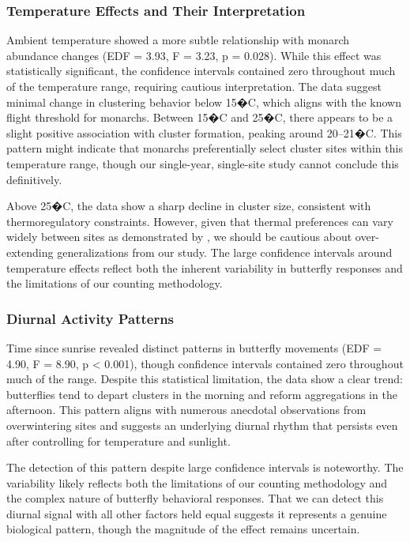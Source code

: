 \subsubsection{Temperature Effects and Their Interpretation}

Ambient temperature showed a more subtle relationship with monarch abundance changes (EDF = 3.93, F = 3.23, p = 0.028). While this effect was statistically significant, the confidence intervals contained zero throughout much of the temperature range, requiring cautious interpretation. The data suggest minimal change in clustering behavior below 15�C, which aligns with the known flight threshold for monarchs. Between 15�C and 25�C, there appears to be a slight positive association with cluster formation, peaking around 20--21�C. This pattern might indicate that monarchs preferentially select cluster sites within this temperature range, though our single-year, single-site study cannot conclude this definitively.

Above 25�C, the data show a sharp decline in cluster size, consistent with thermoregulatory constraints. However, given that thermal preferences can vary widely between sites as demonstrated by \citeauthor{SanieeThesis2016} \autocite{SanieeThesis2016}, we should be cautious about over-extending generalizations from our study. The large confidence intervals around temperature effects reflect both the inherent variability in butterfly responses and the limitations of our counting methodology.

\subsubsection{Diurnal Activity Patterns}

Time since sunrise revealed distinct patterns in butterfly movements (EDF = 4.90, F = 8.90, p < 0.001), though confidence intervals contained zero throughout much of the range. Despite this statistical limitation, the data show a clear trend: butterflies tend to depart clusters in the morning and reform aggregations in the afternoon. This pattern aligns with numerous anecdotal observations from overwintering sites and suggests an underlying diurnal rhythm that persists even after controlling for temperature and sunlight.

The detection of this pattern despite large confidence intervals is noteworthy. The variability likely reflects both the limitations of our counting methodology and the complex nature of butterfly behavioral responses. That we can detect this diurnal signal with all other factors held equal suggests it represents a genuine biological pattern, though the magnitude of the effect remains uncertain.
